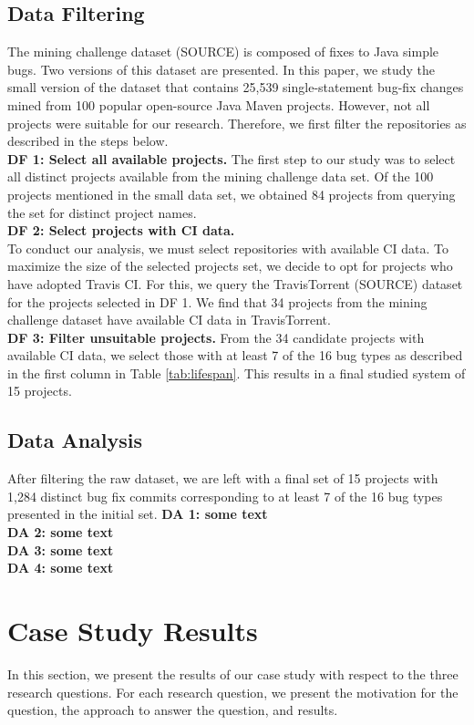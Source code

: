 \documentclass[10pt,conference]{IEEEtran}
\begin{document}
\subsection{Data Filtering}
The mining challenge dataset (SOURCE) is composed of fixes to Java simple bugs. Two versions of this dataset are presented. In this paper, we study the small version of the dataset that contains 25,539 single-statement bug-fix changes mined from 100 popular open-source Java Maven projects. However, not all projects were suitable for our research. Therefore, we first filter the repositories as described in the steps below. \\ 
\textbf{DF 1: Select all available projects.} The first step to our study was to select all distinct projects available from the mining challenge data set. Of the 100 projects mentioned in the small data set, we obtained 84 projects from querying the set for distinct project names. \\
\textbf{DF 2: Select projects with CI data.} \\ To conduct our analysis, we must select repositories with available CI data. To maximize the size of the selected projects set, we decide to opt for projects who have adopted Travis CI. For this, we query the TravisTorrent (SOURCE) dataset for the projects selected in DF 1. We find that 34 projects from the mining challenge dataset have available CI data in TravisTorrent.\\
\textbf{DF 3: Filter unsuitable projects.} From the 34 candidate projects with available CI data, we select those with at least 7 of the 16 bug types as described in the first column in Table \ref{tab:lifespan}. This results in a final studied system of 15 projects. \\ 

\subsection{Data Analysis}
After filtering the raw dataset, we are left with a final set of 15 projects with 1,284 distinct bug fix commits corresponding to at least 7 of the 16 bug types presented in the initial set. 
\textbf{DA 1: some text \\}
\textbf{DA 2: some text \\}
\textbf{DA 3: some text \\}
\textbf{DA 4: some text \\}

\section{Case Study Results}
In this section, we present the results of our case study with respect to the three research questions. For each research question, we present the motivation for the question, the approach to answer the question, and results.
\end{document}
